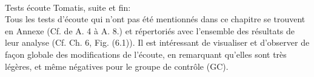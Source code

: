 	Tests écoute Tomatis\textsuperscript \textregistered, suite et fin:
	\\
Tous les  tests d'écoute qui n'ont pas été mentionnés dans ce chapitre  se trouvent en Annexe (Cf. 
de A. 4 à A. 8.) et 
répertoriés avec l'ensemble des résultats de leur analyse (Cf. Ch. 6,  Fig. (6.1)).
Il est intéressant de visualiser et d'observer de façon globale des modifications de l'écoute, en 
remarquant qu'elles sont très légères, et même négatives pour le groupe de contrôle (GC).




 	
 	
 	
 
%                                 
                                 
  
  
